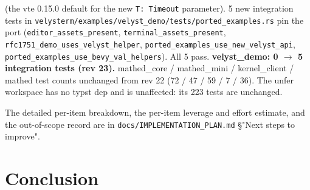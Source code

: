\documentclass[11pt, a4paper]{article}
\begin{document}
\begin{enumerate}
  (the vte 0.15.0 default for the new \texttt{T: Timeout}
  parameter). 5 new integration tests in
  \texttt{velysterm/examples/velyst\_demo/tests/ported\_examples.rs}
  pin the port (\texttt{editor\_assets\_present},
  \texttt{terminal\_assets\_present},
  \texttt{rfc1751\_demo\_uses\_velyst\_helper},
  \texttt{ported\_examples\_use\_new\_velyst\_api},
  \texttt{ported\_examples\_use\_bevy\_val\_helpers}). All 5 pass.
  \textbf{velyst\_demo: 0 $\to$ 5 integration tests (rev 23).}
  mathed\_core / mathed\_mini / kernel\_client / mathed test
  counts unchanged from rev 22 (72 / 47 / 59 / 7 / 36). The
  unfer workspace has no typst dep and is unaffected: its
  223 tests are unchanged.
\end{enumerate}

The detailed per-item breakdown, the per-item leverage and
effort estimate, and the out-of-scope record are in
\texttt{docs/IMPLEMENTATION\_PLAN.md} \S"Next steps to improve".

\section{Conclusion}
\end{document}
